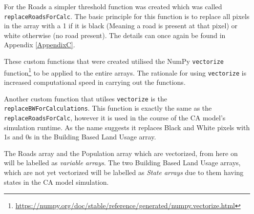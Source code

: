 For the Roads a simpler threshold function was created which was called \texttt{replaceRoadsForCalc}. The basic principle for this function is to replace all pixels in the array with a 1 if it is black (Meaning a road is present at that pixel) or white otherwise (no road present). The details can once again be found in Appendix \ref{AppendixC}.

These custom functions that were created utilised the NumPy \texttt{vectorize} function\footnote{\url{https://numpy.org/doc/stable/reference/generated/numpy.vectorize.html}} to be applied to the entire arrays. The rationale for using \texttt{vectorize} is increased computational speed in carrying out the functions.

Another custom function that utilses \texttt{vectorize} is the \texttt{replaceBWForCalculations}. This function is exactly the same as the \texttt{replaceRoadsForCalc}, however it is used in the course of the CA model's simulation runtime. As the name suggests it replaces Black and White pixels with 1s and 0s in the Building Based Land Usage array.

The Roads array and the Population array which are vectorized, from here on will be labelled as \textit{variable arrays}. The two Building Based Land Usage arrays, which are not yet vectorized will be labelled as \textit{State arrays} due to them having states in the CA model simulation.

